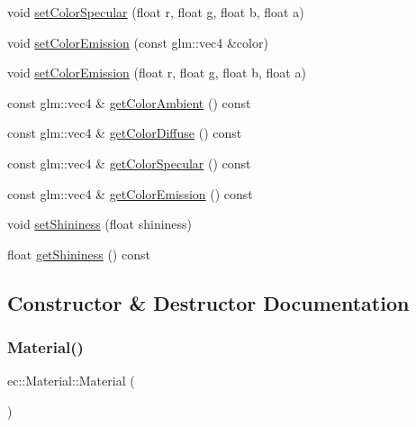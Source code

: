 \begin{DoxyCompactItemize}
\item 
void \mbox{\hyperlink{classec_1_1_material_aa62e40f0571c25eb097f03c74849f918}{set\+Color\+Specular}} (float r, float g, float b, float a)
\item 
void \mbox{\hyperlink{classec_1_1_material_a77ac7702af54e4c8a7301387bea159dd}{set\+Color\+Emission}} (const glm\+::vec4 \&color)
\item 
void \mbox{\hyperlink{classec_1_1_material_a6fa0dfb1c76b2c9b07fbd2b28021010c}{set\+Color\+Emission}} (float r, float g, float b, float a)
\item 
const glm\+::vec4 \& \mbox{\hyperlink{classec_1_1_material_a68e143f6390ae7e9bc6c080853191f94}{get\+Color\+Ambient}} () const
\item 
const glm\+::vec4 \& \mbox{\hyperlink{classec_1_1_material_a6156c82b63756da91d013b5eb39fccf5}{get\+Color\+Diffuse}} () const
\item 
const glm\+::vec4 \& \mbox{\hyperlink{classec_1_1_material_a0a4a766b22c9adeffdff5c0d5140167e}{get\+Color\+Specular}} () const
\item 
const glm\+::vec4 \& \mbox{\hyperlink{classec_1_1_material_af6a4a55683956cd0b06d0a8de1dc4b9f}{get\+Color\+Emission}} () const
\item 
void \mbox{\hyperlink{classec_1_1_material_a4b9efb15466a547d4579566dfb1e558f}{set\+Shininess}} (float shininess)
\item 
float \mbox{\hyperlink{classec_1_1_material_a125ba490c4191f8f6fe77e76934ed33a}{get\+Shininess}} () const
\end{DoxyCompactItemize}


\subsection{Constructor \& Destructor Documentation}
\mbox{\label{classec_1_1_material_a259d88ca352df2d284380f0b37052652}} 
\subsubsection{\texorpdfstring{Material()}{Material()}}
{\footnotesize\ttfamily ec\+::\+Material\+::\+Material (\begin{DoxyParamCaption}{ }\end{DoxyParamCaption})\hspace{0.3cm}{\ttfamily [explicit]}}

